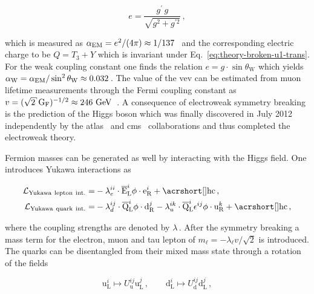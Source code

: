 \begin{equation}
e=\frac{g^{\prime}\,g}{\sqrt{g^2+g^{\prime 2}}}\,,
\end{equation}

which is measured as ${\alpha_\textrm{EM}}=e^2/(4\pi)\approx1/137$~\cite{Olive:2016xmw} and the corresponding electric charge to be $Q=T_3+Y$ which is invariant under Eq.~\ref{eq:theory-broken-u1-trans}. For the weak coupling constant one finds the relation $e=g\cdot\sin\theta_\mathrm{W}$ which yields ${\alpha_\textrm{W}}={\alpha_\textrm{EM}}/\sin^2\theta_\mathrm{W}\approx0.032\,$. The value of the \gls{vev} can be estimated from muon lifetime measurements through the Fermi coupling constant as $v=(\sqrt{2}\,\mathrm{G}_\mathrm{F})^{-1/2}\approx 246~\GeV$~\cite{PhysRevLett.106.041803}. A consequence of electroweak symmetry breaking is the prediction of the Higgs boson which was finally discovered in July 2012 independently by the \gls{atlas}~\cite{Aad:2012tfa} and \gls{cms}~\cite{Chatrchyan:2012xdj} collaborations and thus completed the electroweak theory.


Fermion masses can be generated as well by interacting with the Higgs field. One introduces Yukawa interactions as

\begin{subequations}
\begin{align}
\mathcal{L}_\mathrm{Yukawa~lepton~int.}=&-\lambda_{e}^{ii}\cdot\bar{\mathrm{E}}^{i}_\mathrm{L}\phi\cdot\mathrm{e}^{i}_\mathrm{R}+\mathrm{\gls{hc}}\,, \label{eq:theory-lepton-yukawa}\\
\mathcal{L}_\mathrm{Yukawa~quark~int.}=&-\lambda_{d}^{ij}\cdot\bar{\mathrm{Q}}^{i}_\mathrm{L}\phi\cdot\mathrm{d}^{j}_\mathrm{R}-\lambda_{u}^{ik}\cdot\bar{\mathrm{Q}}^{i}_\mathrm{L}\epsilon^{ij}\phi\cdot\mathrm{u}^{k}_\mathrm{R} +\mathrm{\gls{hc}}\,, \label{eq:theory-quark-yukawa}
\end{align}
\end{subequations}

where the coupling strengths are denoted by $\lambda\,$. After the symmetry breaking a mass term for the electron, muon and tau lepton of $m_\ell=-\lambda_\ell v/\sqrt{2}$ is introduced. The quarks can be disentangled from their mixed mass state through a rotation of the fields 

\begin{equation}
\mathrm{u}^{i}_\mathrm{L}\mapsto U^{ij}_\mathrm{u}\mathrm{u}^{j}_\mathrm{L}\,,\qquad \mathrm{d}^{i}_\mathrm{L}\mapsto U^{ij}_\mathrm{d}\mathrm{d}^{j}_\mathrm{L}\,,
\end{equation}

